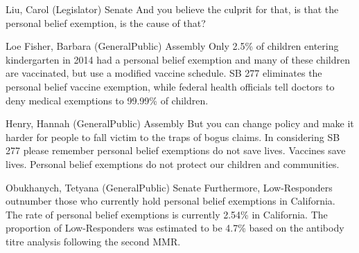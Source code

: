 \begin{result}{11.827085347973137}{Liu, Carol (Legislator) Senate}
And you believe the culprit for that, is that the personal belief exemption, is the cause of that?
\end{result}

\begin{result}{11.561759446383135}{Loe Fisher, Barbara (GeneralPublic) Assembly}
Only 2.5\% of children entering kindergarten in 2014 had a personal belief exemption and many of these children are vaccinated, but use a modified vaccine schedule. SB 277 eliminates the personal belief vaccine exemption, while federal health officials tell doctors to deny medical exemptions to 99.99\% of children.
\end{result}

\begin{result}{11.54110079431982}{Henry, Hannah (GeneralPublic) Assembly}
But you can change policy and make it harder for people to fall victim to the traps of bogus claims. In considering SB 277 please remember personal belief exemptions do not save lives. Vaccines save lives. Personal belief exemptions do not protect our children and communities.
\end{result}

\begin{result}{11.255025021466114}{Obukhanych, Tetyana (GeneralPublic) Senate}
Furthermore, Low-Responders outnumber those who currently hold personal belief exemptions in California. The rate of personal belief exemptions is currently 2.54\% in California. The proportion of Low-Responders was estimated to be 4.7\% based on the antibody titre analysis following the second MMR.
\end{result}

